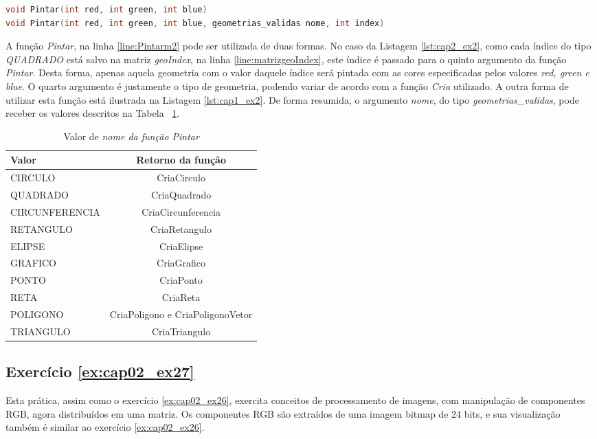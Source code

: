 \begin{lstlisting}[label={func:Pintarm2},language=C++]
void Pintar(int red, int green, int blue) 
void Pintar(int red, int green, int blue, geometrias_validas nome, int index)
\end{lstlisting}
A função \emph{Pintar}, na linha \ref{line:Pintarm2} pode ser utilizada de duas formas. No caso da Listagem \ref{lst:cap2_ex2}, como cada índice do tipo \emph{QUADRADO} está salvo na matriz \emph{geoIndex}, na linha \ref{line:matrizgeoIndex}, este índice é passado para o quinto argumento da função \emph{Pintar}. Desta forma, apenas aquela geometria com o valor daquele índice será pintada com as cores especificadas pelos valores \emph{red, green e blue}. O quarto argumento é justamente o tipo de geometria, podendo variar de acordo com a função \emph{Cria} utilizado. A outra forma de utilizar esta função está ilustrada na Listagem \ref{lst:cap1_ex2}.
De forma resumida, o argumento \emph{nome}, do tipo \emph{geometrias\_validas}, pode receber os valores descritos na Tabela ~\ref{tab:PintarM2}.

\begin{table}[H]
  \caption{Valor de \em{nome} da função \em{Pintar}}
  \centering
    \begin{tabular}{lc}
    \hline
    Valor&\bf Retorno da função \\
    \hline
    CIRCULO & CriaCirculo  \\
    QUADRADO  & CriaQuadrado \\
    CIRCUNFERENCIA  & CriaCircunferencia \\
    RETANGULO  & CriaRetangulo \\
    ELIPSE  & CriaElipse \\
    GRAFICO  & CriaGrafico \\
    PONTO  & CriaPonto \\
    RETA  & CriaReta \\
    POLIGONO  & CriaPoligono e CriaPoligonoVetor \\
    TRIANGULO  & CriaTriangulo \\
    \hline
  \end{tabular}
  \label{tab:PintarM2}
\end{table}

\subsection*{Exercício \ref{ex:cap02_ex27}}
Esta prática, assim como o exercício \ref{ex:cap02_ex26}, exercita conceitos de processamento de imagens, com manipulação de componentes RGB, agora distribuídos em uma matriz. Os componentes RGB são extraídos de uma imagem bitmap de 24 bits, e sua visualização também é similar ao exercício \ref{ex:cap02_ex26}.

